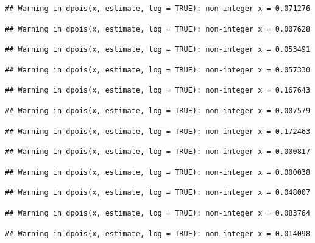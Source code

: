 \documentclass[]{article}
\begin{document}
\begin{verbatim}
## Warning in dpois(x, estimate, log = TRUE): non-integer x = 0.071276
\end{verbatim}

\begin{verbatim}
## Warning in dpois(x, estimate, log = TRUE): non-integer x = 0.007628
\end{verbatim}

\begin{verbatim}
## Warning in dpois(x, estimate, log = TRUE): non-integer x = 0.053491
\end{verbatim}

\begin{verbatim}
## Warning in dpois(x, estimate, log = TRUE): non-integer x = 0.057330
\end{verbatim}

\begin{verbatim}
## Warning in dpois(x, estimate, log = TRUE): non-integer x = 0.167643
\end{verbatim}

\begin{verbatim}
## Warning in dpois(x, estimate, log = TRUE): non-integer x = 0.007579
\end{verbatim}

\begin{verbatim}
## Warning in dpois(x, estimate, log = TRUE): non-integer x = 0.172463
\end{verbatim}

\begin{verbatim}
## Warning in dpois(x, estimate, log = TRUE): non-integer x = 0.000817
\end{verbatim}

\begin{verbatim}
## Warning in dpois(x, estimate, log = TRUE): non-integer x = 0.000038
\end{verbatim}

\begin{verbatim}
## Warning in dpois(x, estimate, log = TRUE): non-integer x = 0.048007
\end{verbatim}

\begin{verbatim}
## Warning in dpois(x, estimate, log = TRUE): non-integer x = 0.083764
\end{verbatim}

\begin{verbatim}
## Warning in dpois(x, estimate, log = TRUE): non-integer x = 0.014098
\end{verbatim}
\end{document}
